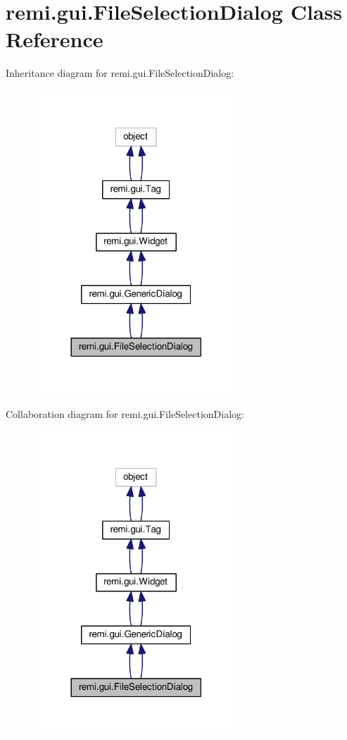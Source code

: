 \hypertarget{classremi_1_1gui_1_1FileSelectionDialog}{}\section{remi.\+gui.\+File\+Selection\+Dialog Class Reference}
\label{classremi_1_1gui_1_1FileSelectionDialog}


Inheritance diagram for remi.\+gui.\+File\+Selection\+Dialog\+:
\nopagebreak
\begin{figure}[H]
\begin{center}
\leavevmode
\includegraphics[width=218pt]{db/d3f/classremi_1_1gui_1_1FileSelectionDialog__inherit__graph}
\end{center}
\end{figure}


Collaboration diagram for remi.\+gui.\+File\+Selection\+Dialog\+:
\nopagebreak
\begin{figure}[H]
\begin{center}
\leavevmode
\includegraphics[width=218pt]{db/d45/classremi_1_1gui_1_1FileSelectionDialog__coll__graph}
\end{center}
\end{figure}
